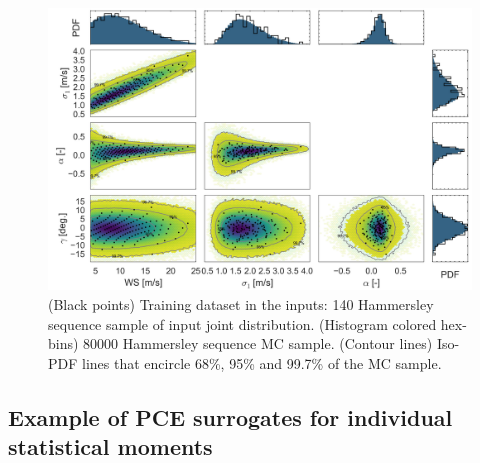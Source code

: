 \documentclass[preprint,12pt]{elsarticle}
\begin{document}
\begin{figure}[h!]
\begin{centering}
\includegraphics[width=0.97\linewidth]{Figures/PCE_train_x_full.jpg}
\caption{(Black points) Training dataset in the inputs: 140 Hammersley sequence sample of input joint distribution. (Histogram colored hex-bins) 80000 Hammersley sequence MC sample. (Contour lines) Iso-PDF lines that encircle 68\%, 95\% and 99.7\% of the MC sample.}
\label{fig_PCE_train_x_full}
\end{centering}
\end{figure}

\subsection{Example of PCE surrogates for individual statistical moments}
\end{document}
